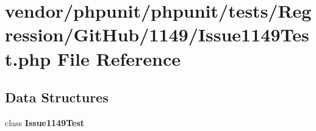 \section{vendor/phpunit/phpunit/tests/\+Regression/\+Git\+Hub/1149/\+Issue1149\+Test.php File Reference}
\label{_issue1149_test_8php}
\subsection*{Data Structures}
\begin{DoxyCompactItemize}
\item 
class {\bf Issue1149\+Test}
\end{DoxyCompactItemize}
